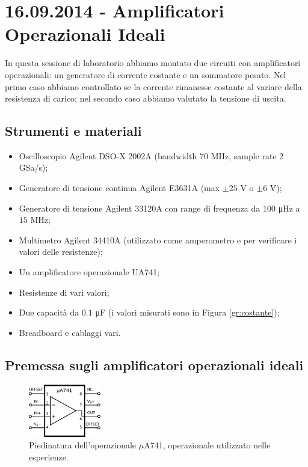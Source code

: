 \section{16.09.2014 - Amplificatori Operazionali Ideali}

In questa sessione di laboratorio abbiamo montato due circuiti con amplificatori operazionali: un generatore di corrente costante e un sommatore pesato. Nel primo caso abbiamo controllato se la corrente rimanesse costante al variare della resistenza di carico; nel secondo caso abbiamo valutato la tensione di uscita.

\subsection*{Strumenti e materiali}

\begin{itemize} [noitemsep]
\item Oscilloscopio Agilent DSO-X 2002A (bandwidth $70$ \si{\mega\hertz}, sample rate $2$ GSa/s);
\item Generatore di tensione continua Agilent E3631A (max $\pm 25$ \si{\volt} o $\pm 6$ \si{\volt});
\item Generatore di tensione Agilent 33120A con range di frequenza da $100$ \si{\micro\hertz} a $15$ \si{\mega\hertz};
\item Multimetro Agilent 34410A (utilizzato come amperometro e per verificare i valori delle resistenze);
\item Un amplificatore operazionale UA741;
\item Resistenze di vari valori;
\item Due capacità da $0.1$ \si{\micro\farad} (i valori misurati sono in Figura \ref{gr:costante});
\item Breadboard e cablaggi vari.
\end{itemize}

\subsection{Premessa sugli amplificatori operazionali ideali}

\begin{figure}
  \begin{center}
    \includegraphics[width=0.280\textwidth]{../E01/latex/UA741.pdf}
  \end{center}
  \caption{Piedinatura dell'operazionale $\mu$A741, operazionale utilizzato nelle esperienze.}
  \label{cir4:piedinatura_UA741}
\end{figure}


